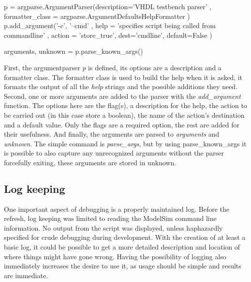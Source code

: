 \documentclass[11pt,british]{article}
\begin{document}
\begin{python}
p = argparse.ArgumentParser(description='VHDL testbench parser'
                            , formatter_class
                              = argparse.ArgumentDefaultsHelpFormatter )
p.add_argument('-c', '--cmd'
               , help = 'specifies script being called from commandline'
               , action = 'store_true', dest='cmdline', default=False )
               
arguments, unknown = p.parse_known_args()
\end{python}
First, the argumentparser \emph{p} is defined, its options are a description and a formatter class. The formatter class is used to build the help when it is asked, it formats the output of all the \emph{help} strings and the possible additions they need. Second, one or more arguments are added to the parser with the \emph{add\_argument} function. The options here are the flag(s), a description for the help, the action to be carried out (in this case store a boolean), the name of the action's destination and a default value. Only the flags are a required option, the rest are added for their usefulness. And finally, the arguments are parsed to \emph{arguments} and \emph{unknown}. The simple command is \emph{parse\_args}, but by using {parse\_known\_args} it is possible to also capture any unrecognized arguments without the parser forcefully exiting, these arguments are stored in unknown.

\subsection{Log keeping}
One important aspect of debugging is a properly maintained log. Before the refresh, log keeping was limited to reading the ModelSim command line information. No output from the script was displayed, unless haphazardly specified for crude debugging during development. With the creation of at least a basic log, it could be possible to get a more detailed description and location of where things might have gone wrong. Having the possibility of logging also immediately increases the desire to use it, as usage should be simple and results are immediate.
\end{document}
